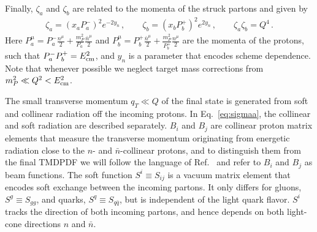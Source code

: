 \documentclass[11pt,a4paper]{article}
\DeclareRobustCommand{\eq}[1]{Eq.~\eqref{eq:#1}}
\DeclareRobustCommand{\mycite}[1]{Ref.~\cite{#1}}
\newcommand{\bn}{{\bar{n}}}
\begin{document}
Finally, $\zeta_a$ and $\zeta_b$ are related to the momenta of the struck partons and given by
\begin{align} \label{eq:zeta}
 \zeta_a = (x_a P_a^-)^2 e^{-2y_n}
 \,, \qquad
 \zeta_b = (x_b P_b^+)^2 e^{2y_n}
 \,, \qquad
 \zeta_a \zeta_b = Q^4
\,.\end{align}
Here $P_a^\mu = P_a^- \frac{n^\mu}{2}+ \frac{m_P^2}{P_a^-}\frac{\bn^\mu}{2}$ and $P_b^\mu = P_b^+ \frac{\bn^\mu}{2}+ \frac{m_P^2}{P_b^+}\frac{n^\mu}{2}$ are the momenta of the protons,
such that $P_a^- P_b^+ = E_{\rm cm}^2$, and $y_n$ is a parameter that encodes scheme dependence. Note that whenever possible we neglect target mass corrections from $m_P^2\ll Q^2< E_{\rm cm}^2$.

The small transverse momentum $q_T \ll Q$ of the final state is generated
from soft and collinear radiation off the incoming protons.
In \eq{sigmaa}, the collinear and soft radiation are described separately.
$B_{i}$ and $B_{j}$ are collinear proton matrix elements that measure the transverse momentum
originating from energetic radiation close to the $n$- and $\bn$-collinear protons,
and to distinguish them from the final TMDPDF we will follow the language of \mycite{Stewart:2009yx}
and refer to $B_{i}$ and $B_{j}$ as beam functions.
The soft function $S^i\equiv S_{ij}$ is a vacuum matrix element that encodes soft exchange between the incoming partons.
It only differs for gluons, $S^g \equiv S_{gg}$, and quarks, $S^q \equiv S_{q\bar q}$,
but is independent of the light quark flavor.
$S^i$ tracks the direction of both incoming partons, and hence depends on both light-cone directions $n$ and $\bn$.
\end{document}

